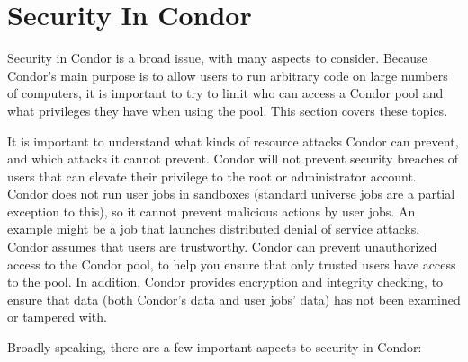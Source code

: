 \section{\label{sec:Security}Security In Condor}

Security in Condor is a broad issue, with many aspects to consider.
Because Condor's main purpose is to allow users to run
arbitrary code on large numbers of computers,
it is important to try to
limit who can access a Condor pool and what privileges they have when
using the pool.
This section covers these topics. 

It is important to understand what kinds of resource attacks 
Condor can prevent, and which attacks it cannot prevent.
Condor will not prevent security breaches
of users
that can elevate their privilege to the root or
administrator account.
Condor does not run user jobs in sandboxes
(standard universe jobs are a partial exception to this),
so it cannot prevent
malicious actions by user jobs.
An example might be a job that launches distributed denial of service
attacks.
Condor assumes that users are trustworthy.
Condor can
prevent unauthorized access to the Condor pool,
to help you ensure that only trusted users have access to the pool.
In addition,
Condor provides encryption and integrity checking,
to ensure that data
(both Condor's data and user jobs' data)
has not been examined or tampered with. 

Broadly speaking, there are a few important aspects to security in
Condor: 

